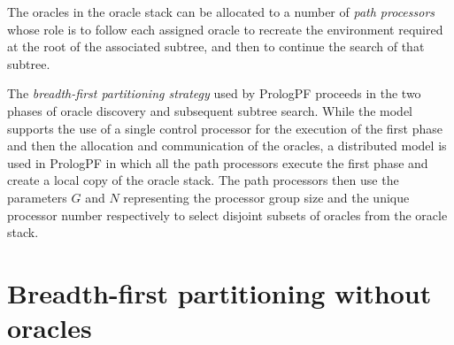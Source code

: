 The oracles in the oracle stack can be allocated to a number of
\textit{path processors} whose role is to follow each assigned oracle
to recreate the environment required at the root of the associated
subtree, and then to continue the search of that subtree.

The \textit{breadth-first partitioning strategy} used by PrologPF proceeds
in the two phases of oracle discovery and subsequent subtree search.
While the model supports the use of a single control processor for
the execution of the first phase and then the allocation 
and communication of the oracles,
a distributed model is used in PrologPF in which all the path
processors execute the first phase and create a local copy of the
oracle stack.  The path processors then use the parameters $G$ and
$N$ representing the processor group size and the unique processor
number respectively to select disjoint subsets of oracles from the oracle stack.

\section{Breadth-first partitioning without oracles} %
\label{no_orcs}

